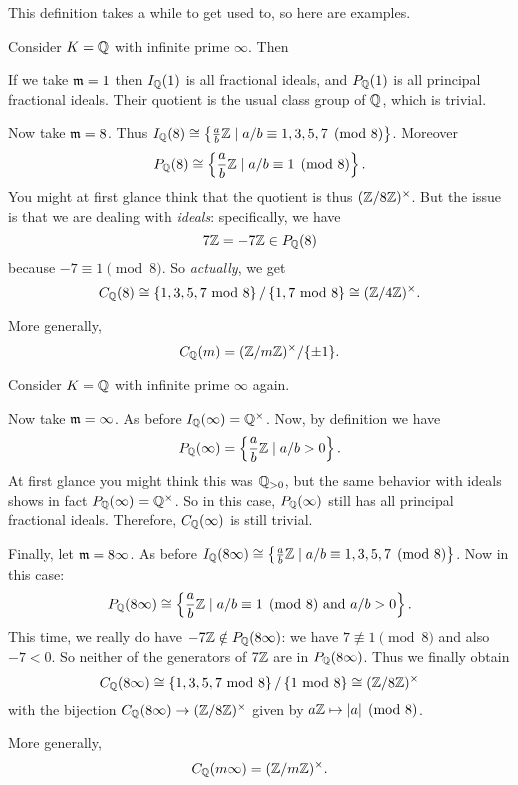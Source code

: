 This definition takes a while to get used to, so here are examples.
\begin{example}
	\label{ex:ray_class_group_finite_modulus}
	Consider $K = \mathbb Q$ with infinite prime $\infty$. Then
	\begin{itemize}
		\ii If we take $\mathfrak m = 1$ then $I_\mathbb Q(1)$ is all fractional ideals,
		and $P_\mathbb Q(1)$ is all principal fractional ideals.
		Their quotient is the usual class group of $\mathbb Q$, which is trivial.

		\ii Now take $\mathfrak m = 8$.
		Thus $I_\mathbb Q(8) \cong \left\{ \frac ab\mathbb Z \mid
			a/b \equiv 1,3,5,7 \pmod 8 \right\}$.
		Moreover
		\[ P_\mathbb Q(8) \cong \left\{ \frac ab\mathbb Z \mid
			a/b \equiv 1 \pmod 8 \right\}. \]
		You might at first glance think that
		the quotient is thus $(\mathbb Z/8\mathbb Z)^\times$.
		But the issue is that we are dealing with \emph{ideals}:
		specifically, we have
		\[ 7\mathbb Z = -7\mathbb Z \in P_\mathbb Q(8) \]
		because $-7 \equiv 1 \pmod 8$.
		So \emph{actually}, we get
		\[
			C_\mathbb Q(8)
			\cong \left\{ 1,3,5,7 \text{ mod } 8 \right\}
			/ \left\{ 1,7 \text{ mod } 8 \right\}
			\cong (\mathbb Z/4\mathbb Z)^\times.
		\]
	\end{itemize}
	More generally,
	\[ C_\mathbb Q(m) = (\mathbb Z/m\mathbb Z)^\times / \{\pm1\}. \]
\end{example}
\begin{example}
	Consider $K = \mathbb Q$ with infinite prime $\infty$ again.
	\begin{itemize}
		\ii Now take $\mathfrak m = \infty$.
		As before $I_\mathbb Q(\infty) = \mathbb Q^\times$.
		Now, by definition we have
		\[ P_\mathbb Q(\infty) = \left\{ \frac ab \mathbb Z \mid a/b > 0 \right\}. \]
		At first glance you might think this was $\mathbb Q_{>0}$,
		but the same behavior with ideals shows in fact $P_\mathbb Q(\infty) = \mathbb Q^\times$.
		So in this case, $P_\mathbb Q(\infty)$ still has all principal fractional ideals.
		Therefore, $C_\mathbb Q(\infty)$ is still trivial.

		\ii Finally, let $\mathfrak m = 8\infty$.
		As before $I_\mathbb Q(8\infty) \cong \left\{ \frac ab\mathbb Z \mid
			a/b \equiv 1,3,5,7 \pmod 8 \right\}$.
		Now in this case:
		\[ P_\mathbb Q(8\infty) \cong \left\{ \frac ab\mathbb Z \mid
			a/b \equiv 1 \pmod 8 \text{ and } a/b > 0 \right\}.  \]
		This time, we really do have $-7\mathbb Z \notin P_\mathbb Q(8\infty)$:
		we have $7 \not\equiv 1 \pmod 8$ and also $-7 < 0$.
		So neither of the generators of $7\mathbb Z$ are in $P_\mathbb Q(8\infty)$.
		Thus we finally obtain
		\[
			C_\mathbb Q(8\infty)
			\cong \left\{ 1,3,5,7 \text{ mod } 8 \right\}
			/ \left\{ 1 \text{ mod } 8 \right\}
			\cong (\mathbb Z/8\mathbb Z)^\times
		\]
		with the bijection $C_\mathbb Q(8\infty) \to (\mathbb Z/8\mathbb Z)^\times$
		given by $a\mathbb Z \mapsto |a| \pmod 8$.
	\end{itemize}
	More generally,
	\[ C_\mathbb Q(m\infty) = (\mathbb Z/m\mathbb Z)^\times. \]
\end{example}

